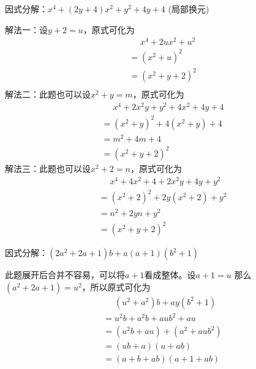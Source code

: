 \documentclass[windows,csize4,answers]{BHCexam}
\begin{document}
\begin{groups}
\begin{questions}[]
        \question[5]因式分解：$x^4+(2y+4)x^2+y^2+4y+4$ (局部换元)
        \begin{solution}{0.5cm}
            \methodonly 解法一：设$y+2=u$，原式可化为
            \[
                \begin{aligned}
                     & \phantom{=}x^4+2ux^2+u^2 \\
                     & =(x^2+u)^2               \\
                     & =(x^2+y+2)^2             \\
                \end{aligned}
            \]
            解法二：此题也可以设$x^2+y=m$，原式可化为
            \[
                \begin{aligned}
                     & \phantom{=}x^4+2x^2 y+y^2+4x^2+4y+4 \\
                     & =(x^2+y)^2 + 4(x^2+y) +4            \\
                     & =m^2+4m+4                           \\
                     & =(x^2+y+2)^2
                \end{aligned}
            \]
            解法三：此题也可以设$x^2+2=n$，原式可化为
            \[
                \begin{aligned}
                     & \phantom{=}x^4+4x^2+4+2x^2 y+4y+y^2 \\
                     & =(x^2+2)^2+2y(x^2+2)+y^2            \\
                     & =n^2+2yn+y^2                        \\
                     & =(x^2+y+2)^2
                \end{aligned}
            \]
        \end{solution}
        \vspace{3.5cm}

        \question[5] 因式分解：$(2a^2+2a+1)b+a(a+1)(b^2+1)$
        \begin{solution}{0.5cm}
            \methodonly 此题展开后合并不容易，可以将$a+1$看成整体。设$a+1=u$
            那么$(a^2+2a+1)=u^2$，所以原式可化为
            \[
                \begin{aligned}
                     & \phantom{=}(u^2+a^2)b+ay(b^2+1) \\
                     & =u^2b+a^2b+aub^2+au             \\
                     & =(u^2b+au)+(a^2+aub^2)          \\
                     & =(ub+a)(u+ab)                   \\
                     & =(a+b+ab)(a+1+ab)
                \end{aligned}
            \]
        \end{solution}


\end{questions}
\end{groups}
\end{document}
